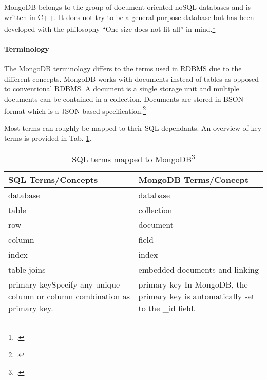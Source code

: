 MongoDB belongs to the group of document oriented noSQL databases and is written
in C++. It does not try to be a general purpose database but has been developed
with the philosophy ``One size does not fit all'' in mind.\footcite[Cf.][3]{Plugge_2010}

\paragraph{Terminology}
The MongoDB terminology differs to the terms used in RDBMS due to the different
concepts. MongoDB works with documents instead of tables as opposed to conventional RDBMS.
A document is a single storage unit and multiple documents can be contained in a
collection. Documents are stored in BSON format which is a JSON based
specification.\footcite[Cf.][]{bson_spec}

Most terms can roughly be mapped to their SQL dependants. An overview of key terms
is provided in Tab. \ref{tab:sql-mongo-map}.

\begin{table}[ht]
\begin{tabular*}{0.95\textwidth}{p{} p{}}
\toprule
\textbf{SQL Terms/Concepts} & \textbf{MongoDB Terms/Concept}\\
\midrule 
database & 	database\\
table 	 &	collection\\
row 	 &	document\\
column 	 &	field\\
index 	 &	index\\
table joins &	embedded documents and linking\\
primary key\newline Specify any unique column or column combination as primary
key.
		&
primary key\newline
In MongoDB, the primary key is automatically set to the \_id field.\\

\bottomrule 
\end{tabular*}
  \begin{savenotes}
  \caption{SQL terms mapped to MongoDB\footcite[][]{mongo_sql_comp}
  }
  \label{tab:sql-mongo-map}
  \end{savenotes}
\end{table}


